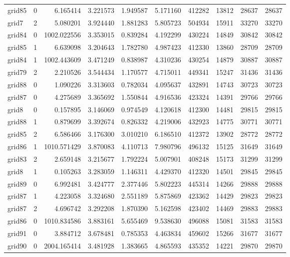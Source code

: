 \begin{longtable}{|l|r|r|r|r|r|r|r|r|r|}
grid85 & 0 & 6.165414 & 3.221573 & 1.949587 & 5.171160 & 412282 & 13812 & 28637 & 28637 \\
grid7 & 2 & 5.080201 & 3.924440 & 1.881283 & 5.805723 & 504934 & 15911 & 33270 & 33270 \\
grid84 & 0 & 1002.022556 & 3.353015 & 0.839284 & 4.192299 & 430224 & 14849 & 30842 & 30842 \\
grid85 & 1 & 6.639098 & 3.204643 & 1.782780 & 4.987423 & 412330 & 13860 & 28709 & 28709 \\
grid84 & 1 & 1002.443609 & 3.471249 & 0.838987 & 4.310236 & 430254 & 14879 & 30887 & 30887 \\
grid79 & 2 & 2.210526 & 3.544434 & 1.170577 & 4.715011 & 449341 & 15247 & 31436 & 31436 \\
grid88 & 0 & 1.090226 & 3.313603 & 0.782034 & 4.095637 & 432891 & 14743 & 30723 & 30723 \\
grid87 & 0 & 4.275689 & 3.365692 & 1.550844 & 4.916536 & 423324 & 14391 & 29766 & 29766 \\
grid8 & 0 & 0.157895 & 3.146069 & 0.974549 & 4.120618 & 412300 & 14481 & 29815 & 29815 \\
grid88 & 1 & 0.879699 & 3.392674 & 0.826332 & 4.219006 & 432923 & 14775 & 30771 & 30771 \\
grid85 & 2 & 6.586466 & 3.176300 & 3.010210 & 6.186510 & 412372 & 13902 & 28772 & 28772 \\
grid86 & 1 & 1010.571429 & 3.870083 & 4.110713 & 7.980796 & 496132 & 15125 & 31649 & 31649 \\
grid83 & 2 & 2.659148 & 3.215677 & 1.792224 & 5.007901 & 408248 & 15173 & 31299 & 31299 \\
grid8 & 1 & 0.105263 & 3.283059 & 1.146311 & 4.429370 & 412320 & 14501 & 29845 & 29845 \\
grid89 & 0 & 6.992481 & 3.424777 & 2.377446 & 5.802223 & 445314 & 14266 & 29888 & 29888 \\
grid87 & 1 & 4.223058 & 3.324680 & 2.551189 & 5.875869 & 423362 & 14429 & 29823 & 29823 \\
grid87 & 2 & 4.696742 & 3.292208 & 1.870390 & 5.162598 & 423402 & 14469 & 29883 & 29883 \\
grid86 & 0 & 1010.834586 & 3.883161 & 5.655469 & 9.538630 & 496088 & 15081 & 31583 & 31583 \\
grid91 & 0 & 3.884712 & 3.678481 & 0.785353 & 4.463834 & 459602 & 15266 & 31677 & 31677 \\
grid90 & 0 & 2004.165414 & 3.481928 & 1.383665 & 4.865593 & 435352 & 14221 & 29870 & 29870 \\

\end{longtable}
